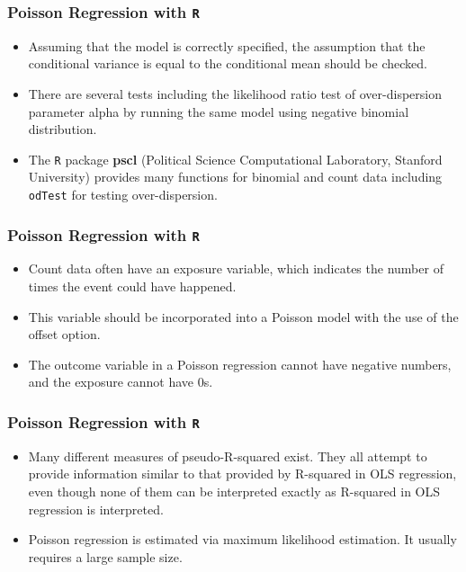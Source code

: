 \documentclass[00-GLMregslides.tex]{subfiles}
\begin{document}
\begin{frame}[fragile]
\frametitle{Poisson Regression with \texttt{R}}
	\Large
\begin{itemize}
\item Assuming that the model is correctly specified, the assumption that the conditional variance is equal 
to the conditional mean should be checked. 
\item There are several tests including the likelihood ratio test of over-dispersion parameter alpha by running the 
same model using negative binomial distribution. 
\item The \texttt{R} package \textbf{pscl} (Political Science Computational Laboratory, Stanford University) provides many functions for binomial 
and count data including \texttt{odTest} for testing over-dispersion. 
\end{itemize}
\end{frame}
\begin{frame}[fragile]
	\frametitle{Poisson Regression with \texttt{R}}
	\Large
	\begin{itemize} 
\item Count data often have an exposure variable, which indicates the number of times the event could have happened. 
\item This variable should be incorporated into a Poisson model with the use of the offset option.
\item The outcome variable in a Poisson regression cannot have negative numbers, and the exposure cannot have 0s.
\end{itemize}
\end{frame}
\begin{frame}[fragile]
	\frametitle{Poisson Regression with \texttt{R}}
	\Large
	\begin{itemize} 

\item Many different measures of pseudo-R-squared exist. They all attempt to provide information similar to that provided by R-squared in OLS regression, even though none of them can be interpreted exactly as R-squared in OLS regression is interpreted.
 
\item Poisson regression is estimated via maximum likelihood estimation. It usually requires a large sample size. 
\end{itemize}
\end{frame}

\end{document}
